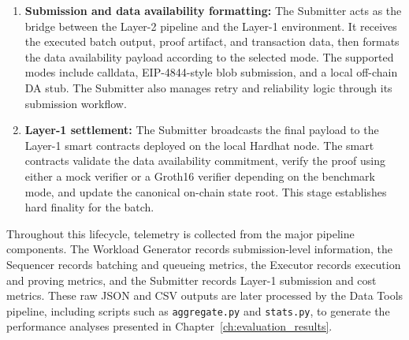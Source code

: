 \begin{enumerate}
    \item \textbf{Submission and data availability formatting:}
    The Submitter acts as the bridge between the Layer-2 pipeline and the Layer-1 environment. It receives the executed batch output, proof artifact, and transaction data, then formats the data availability payload according to the selected mode. The supported modes include calldata, EIP-4844-style blob submission, and a local off-chain DA stub. The Submitter also manages retry and reliability logic through its submission workflow.

    \item \textbf{Layer-1 settlement:}
    The Submitter broadcasts the final payload to the Layer-1 smart contracts deployed on the local Hardhat node. The smart contracts validate the data availability commitment, verify the proof using either a mock verifier or a Groth16 verifier depending on the benchmark mode, and update the canonical on-chain state root. This stage establishes hard finality for the batch.
\end{enumerate}

Throughout this lifecycle, telemetry is collected from the major pipeline components. The Workload Generator records submission-level information, the Sequencer records batching and queueing metrics, the Executor records execution and proving metrics, and the Submitter records Layer-1 submission and cost metrics. These raw JSON and CSV outputs are later processed by the Data Tools pipeline, including scripts such as \texttt{aggregate.py} and \texttt{stats.py}, to generate the performance analyses presented in Chapter~\ref{ch:evaluation_results}.

